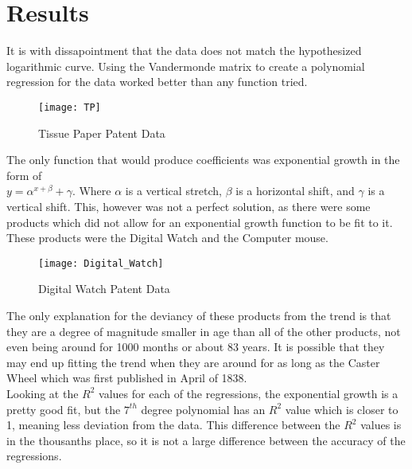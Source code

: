 \documentclass[12pt]{article}
\begin{document}
\section{Results}\label{Sec_Results}
	It is with dissapointment that the data does not match the hypothesized logarithmic curve. Using the Vandermonde matrix to create a polynomial regression for the data worked better than any function tried. 
	\begin{wrapfigure}{r}{0.75\textwidth}
		\texttt{[image: TP]}
		\caption{\label{fig3}Tissue Paper Patent Data}
	\end{wrapfigure}
The only function that would produce coefficients was exponential growth in the form of\\ $y=\alpha^{x+\beta} + \gamma$. Where $\alpha$ is a vertical stretch, $\beta$ is a horizontal shift, and $\gamma$ is a vertical shift. This, however was not a perfect solution, as there were some products which did not allow for an exponential growth function to be fit to it. These products were the Digital Watch and the Computer mouse.\\
	\begin{wrapfigure}{r}{0.75\textwidth}
		\texttt{[image: Digital\_Watch]}
		\caption{\label{fig4}Digital Watch Patent Data}
	\end{wrapfigure}
\par The only explanation for the deviancy of these products from the trend is that they are a degree of magnitude smaller in age than all of the other products, not even being around for 1000 months or about 83 years. It is possible that they may end up fitting the trend when they are around for as long as the Caster Wheel which was first published in April of 1838. \\
Looking at the $R^2$ values for each of the regressions, the exponential growth is a pretty good fit, but the $7^{th}$ degree polynomial has an $R^2$ value which is closer to 1, meaning less deviation from the data. This difference between the $R^2$ values is in the thousanths place, so it is not a large difference between the accuracy of the regressions.\\
\end{document}
